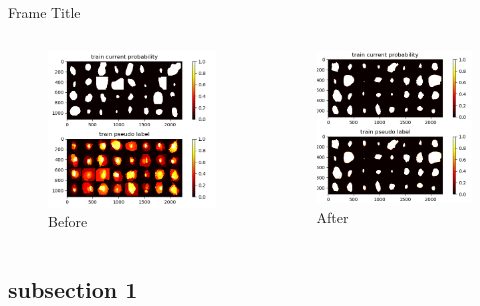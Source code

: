 \begin{frame}{Frame Title}

\begin{columns}
\begin{figure}
    \centering
    \includegraphics[width=1.\textwidth]{images/before.png}
    \caption*{Before}
\end{figure}

\begin{figure}
    \centering
    \includegraphics[width=1.\textwidth]{images/after.png}
    \caption*{After}
\end{figure}
\end{columns}
\end{frame}

\subsection{subsection 1}